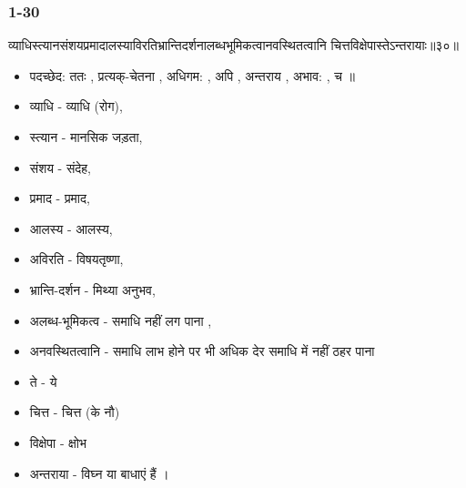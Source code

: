 \begin{frame}[fragile]\frametitle{1-30}
\begin{sanskrit}
व्याधिस्त्यानसंशयप्रमादालस्याविरतिभ्रान्तिदर्शनालब्धभूमिकत्वानवस्थितत्वानि चित्तविक्षेपास्तेऽन्तरायाः॥३०॥
\end{sanskrit}

	\begin{itemize}
	\item पदच्छेद: ततः , प्रत्यक्-चेतना , अधिगम: , अपि , अन्तराय , अभाव: , च ॥
	\item व्याधि - व्याधि (रोग),
	\item स्त्यान - मानसिक जड़ता,
	\item संशय - संदेह,
	\item प्रमाद - प्रमाद,
	\item आलस्य - आलस्य,
	\item अविरति - विषयतृष्णा,
	\item भ्रान्ति-दर्शन - मिथ्या अनुभव,
	\item अलब्ध-भूमिकत्व - समाधि नहीं लग पाना ,
	\item अनवस्थितत्वानि - समाधि लाभ होने पर भी अधिक देर समाधि में नहीं ठहर पाना
	\item ते - ये
	\item चित्त - चित्त (के नौ)
	\item विक्षेपा - क्षोभ
	\item अन्तराया - विघ्न या बाधाएं हैं ।
	\end{itemize}
\end{frame}


